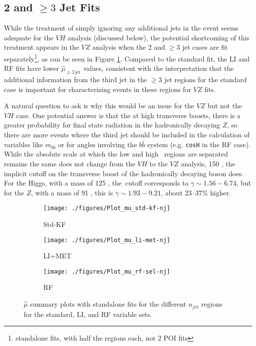\subsection{2 and $\ge3$ Jet Fits}
While the treatment of simply ignoring any additional jets in the event seems adequate for the $VH$ analysis (discussed below), the potential shortcoming of this treatment appears in the $VZ$ analysis when the 2 and $\ge3$ jet cases are fit separately\footnote{standalone fits, with half the regions each, not 2 POI fits}, as can be seen in Figure \ref{fig:NJetBreakdownSummaryvz}.  Compared to the standard fit, the LI and RF fits have lower $\hat{\mu}_{\ge3\,\text{jet}}$ values, consistent with the interpretation that the additional information from the third jet in the $\ge3$ jet regions for the standard case is important for characterizing events in these regions for $VZ$ fits.  

A natural question to ask is why this would be an issue for the $VZ$ but not the $VH$ case.  One potential answer is that the at high transverse boosts, there is a greater probability for final state radiation in the hadronically decaying $Z$, so there are more events where the third jet should be included in the calculation of variables like $m_{b\bar{b}}$ or for angles involving the $b\bar{b}$ system (e.g. \texttt{cosH} in the RF case).  While the absolute scale at which the low and high \ptv\, regions are separated remains the same does not change from the $VH$ to the $VZ$ analysis, 150 \GeV, the implicit cutoff on the transverse boost of the hadronically decaying boson does.  For the Higgs, with a mass of 125 \GeV, the \ptv\,cutoff corresponds to $\gamma\sim1.56-6.74$, but for the $Z$, with a mass of 91 \GeV, this is $\gamma\sim1.93-9.21$, about 23--37\% higher.

\begin{figure}[!htbp]\captionsetup{justification=centering}
  \centering
\begin{subfigure}[t]{0.49000\textwidth}\centering\texttt{[image: ./figures/Plot\_mu\_std-kf-nj]}\caption{Std-KF}\end{subfigure}
\begin{subfigure}[t]{0.49000\textwidth}\centering\texttt{[image: ./figures/Plot\_mu\_li-met-nj]}\caption{LI+MET}\end{subfigure}
\begin{subfigure}[t]{0.49\textwidth}\centering\texttt{[image: ./figures/Plot\_mu\_rf-sel-nj]}\caption{RF}\end{subfigure}
  \caption{$\hat{\mu}$ summary plots with standalone fits for the different $n_{jet}$ regions for the standard, LI, and RF variable sets.}
  \label{fig:NJetBreakdownSummaryvz}
\end{figure}

